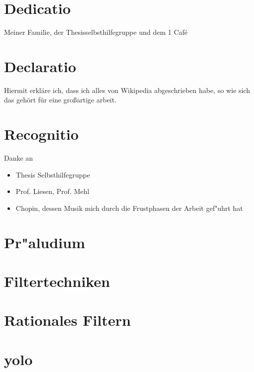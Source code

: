 \documentclass[11pt, twoside]{report} %
\begin{document}


\chapter*{Dedicatio}
Meiner Familie, der Thesisselbsthilfegruppe und dem 1 Café

\chapter*{Declaratio}
Hiermit erkläre ich, dass ich alles von Wikipedia abgeschrieben habe, so
wie sich das gehört für eine großartige arbeit.

\chapter*{Recognitio}
Danke an
\begin{itemize}
\item Thesis Selbsthilfegruppe
\item Prof. Liesen, Prof. Mehl
\item Chopin, dessen Musik mich durch die Frustphasen der Arbeit gef"uhrt hat
\end{itemize}

\tableofcontents

\chapter{Pr"aludium}%


\chapter{Filtertechniken} %


\chapter{Rationales Filtern}%


%

%

\appendix
\chapter{yolo}


\nocite{*}
\printbibliography
\end{document}

